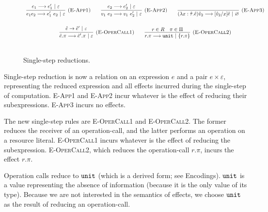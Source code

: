 \begin{figure}[h]

\noindent
{}

\[
\begin{array}{c}

\infer[\textsc{(E-App1)}]
	{e_1 e_2 \longrightarrow e_1'~ e_2~|~\varepsilon}
	{e_1 \longrightarrow e_1'~|~\varepsilon}
	~~~~~~
\infer[\textsc{(E-App2)}]
	{v_1 ~ e_2 \longrightarrow v_1 ~ e_2'~|~\varepsilon} 
	{e_2 \longrightarrow e_2'~|~\varepsilon}
~~~~~~
\infer[\textsc{(E-App3)}]
	{ (\lambda x: \hat \tau.\hat e) \hat v_2 \longrightarrow [\hat v_2/x]\hat e~|~\varnothing }
	{}\\[4ex]
	
\infer[\textsc{(E-OperCall1)}]
	{\hat e.\pi \longrightarrow \hat e'.\pi~|~\varepsilon }
	{\hat e \rightarrow \hat e'~|~\varepsilon}
		
	~~~~~~
	
\infer[\textsc{(E-OperCall2)}]
	{r.\pi \longrightarrow \kwa{unit}~|~\{ r.\pi \} }
	{r \in R & \pi \in \Pi}
	 \\[4ex]
	 
\end{array}
\]


\vspace{-7pt}
\caption{Single-step reductions.}
\label{This is the label.}
\end{figure}

Single-step reduction is now a relation on an expression $e$ and a pair $e \times \varepsilon$, representing the reduced expression and all effects incurred during the single-step of computation. \textsc{E-App1} and \textsc{E-App2} incur whatever is the effect of reducing their subexpressions. \textsc{E-App3} incurs no effects.

The new single-step rules are \textsc{E-OperCall1} and \textsc{E-OperCall2}. The former reduces the receiver of an operation-call, and the latter performs an operation on a resource literal. \textsc{E-OperCall1} incurs whatever is the effect of reducing the subexpression. \textsc{E-OperCall2}, which reduces the operation-call $r.\pi$, incurs the effect $r.\pi$.

Operation calls reduce to $\mathtt{unit}$ (which is a derived form; see Encodings). $\mathtt{unit}$ is a value representing the absence of information (because it is the only value of its type). Because we are not interested in the semantics of effects, we choose $\mathtt{unit}$ as the result of reducing an operation-call. \\

